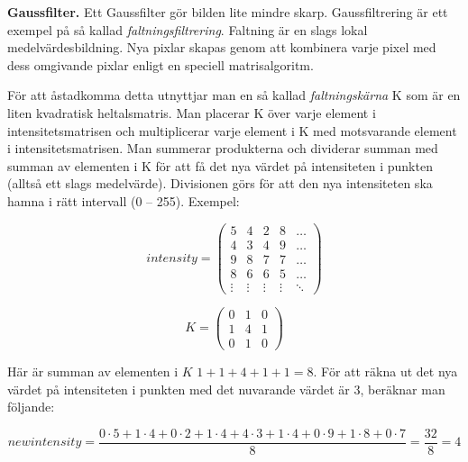 \Task \textbf{Gaussfilter.} Ett Gaussfilter gör bilden lite mindre skarp. Gaussfiltrering är ett exempel på så kallad \emph{faltningsfiltrering}. Faltning  är en slags lokal medelvärdesbildning. Nya pixlar skapas genom att kombinera varje pixel med dess omgivande pixlar enligt en speciell matrisalgoritm.

För att åstadkomma detta utnyttjar man en så kallad \emph{faltningskärna} K som är en liten kvadratisk heltalsmatris. Man placerar K över varje element i intensitetsmatrisen och multiplicerar varje element i K med motsvarande element i intensitetsmatrisen. Man summerar produkterna och dividerar summan med summan av elementen i K för att få det nya värdet på intensiteten i punkten (alltså ett slags medelvärde). Divisionen görs för att den nya intensiteten ska hamna i rätt intervall (0 -- 255).
Exempel:

\vspace{1em}
\begin{minipage}{5cm}
\begin{displaymath}
\mathit{intensity} = \left(
\begin{array}{ccccc}
5 & 4 & 2 & 8 & \ldots \\
4 & 3 & 4 & 9 & \ldots \\
9 & 8 & 7 & 7 & \ldots \\
8 & 6 & 6 & 5 & \ldots \\
\vdots & \vdots & \vdots & \vdots & \ddots
\end{array}
\right)
\end{displaymath}
\end{minipage}\hspace{2cm}
\begin{minipage}{5cm}
\begin{displaymath}
K = \left(
\begin{array}{ccc}
0 & 1 & 0 \\
1 & 4 & 1 \\
0 & 1 & 0
\end{array}
\right)
\end{displaymath}
\end{minipage}

\vspace{2em}\noindent Här är summan av elementen i $K$ $1+1+4+1+1 = 8$. För att räkna ut det nya värdet på intensiteten i punkten  med det nuvarande värdet är 3, beräknar man följande:

\begin{displaymath}
\mathit{newintensity} = \frac{0 \cdot 5 + 1 \cdot 4 + 0 \cdot 2 + 1 \cdot 4 + 4 \cdot 3 + 1 \cdot 4 + 0 \cdot 9 + 1 \cdot 8 + 0 \cdot 7}{8} = \frac{32}{8} = 4
\end{displaymath}


